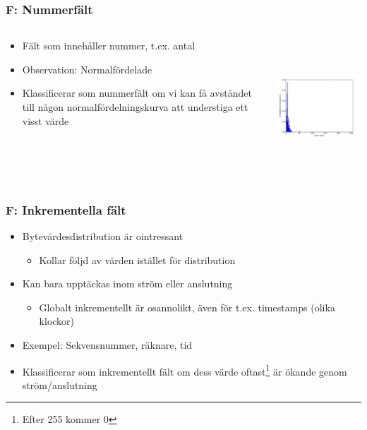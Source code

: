 \documentclass[xetex, 8pt]{beamer}
\begin{document}
    \begin{frame}
        \frametitle{F: Nummerfält}
        \begin{columns}[t]
            \begin{column}[T]{6cm}
                \begin{itemize}
                    \item Fält som innehåller nummer, t.ex. antal
                    \item Observation: Normalfördelade
                    \item Klassificerar som nummerfält om vi kan få avståndet
                        till någon normalfördelningskurva att understiga ett
                        visst värde
                \end{itemize}
            \end{column}
            \begin{column}[T]{6cm}
                \includegraphics[height=5cm]{img/number.pdf}
            \end{column}
        \end{columns}
    \end{frame}
    \begin{frame}
        \frametitle{F: Inkrementella fält}
        \begin{itemize}
            \item Bytevärdesdistribution är ointressant
                \begin{itemize}
                    \item Kollar följd av värden istället för distribution
                \end{itemize}
            \item Kan bara upptäckas inom ström eller anslutning
                \begin{itemize}
                    \item Globalt inkrementellt är osannolikt, även för t.ex. timestamps (olika klockor)
                \end{itemize}
            \item Exempel: Sekvensnummer, räknare, tid
            \item Klassificerar som inkrementellt fält om dess värde
                oftast\footnote{Efter 255 kommer 0} är ökande genom
                ström/anslutning
        \end{itemize}
    \end{frame}
\end{document}
